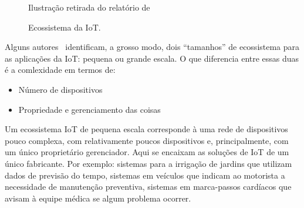 \documentclass[pdftex, brazil, 12pt, twoside]{article}
\begin{document}
\begin{figure}[h]
  \begin{center}
    \caption{Ecossistema da IoT.}
    \label{fig:ecossistema2}
    
    \footnotesize{Ilustração retirada do relatório de~\citet{UKGOSWalportIoT2014}}
  \end{center}
\end{figure}

Alguns autores~\citep{UKGOSWalportIoT2014,IEEEIoTDefinition,BarbozaTCCIoT2015}
identificam, a grosso modo, dois ``tamanhos'' de ecossistema para as aplicações da IoT:
pequena ou grande escala. O que diferencia entre essas duas é a comlexidade em termos
de:

\begin{itemize}[noitemsep]
\item Número de dispositivos
\item Propriedade e gerenciamento das coisas
\end{itemize}

Um ecossistema IoT de pequena escala corresponde à uma rede de dispositivos
pouco complexa, com relativamente poucos dispositivos e, principalmente, com
um único proprietário gerenciador. Aqui se encaixam as soluções
de IoT de um único fabricante. Por exemplo: sistemas para a irrigação de jardins
que utilizam dados de previsão do tempo, sistemas em veículos que indicam ao
motorista a necessidade de manutenção preventiva, sistemas em marca-passos cardíacos
que avisam à equipe médica se algum problema ocorrer.
\end{document}
